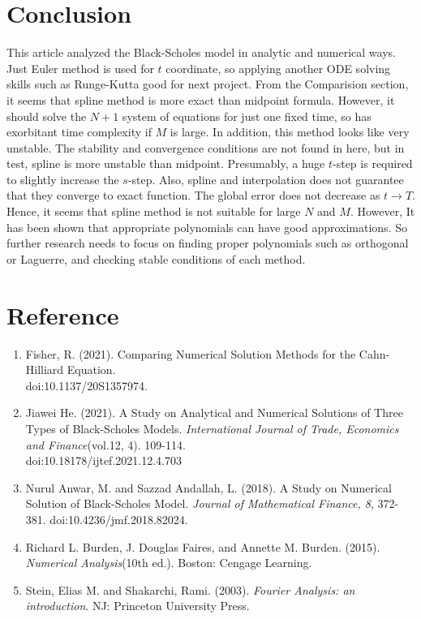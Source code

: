\section{Conclusion}
	This article analyzed the Black-Scholes model in analytic and numerical ways. Just Euler method is used for $t$ coordinate, so applying another ODE solving skills such as Runge-Kutta good for next project. From the Comparision section, it seems that spline method is more exact than midpoint formula. However, it should solve the $N+1$ system of equations for just one fixed time, so has exorbitant time complexity if $M$ is large. In addition, this method looks like very unstable. The stability and convergence conditions are not found in here, but in test, spline is more unstable than midpoint. Presumably, a huge $t$-step is required to slightly increase the $s$-step. Also, spline and interpolation does not guarantee that they converge to exact function. The global error does not decrease as $t\rightarrow T$. Hence, it seems that spline method is not suitable for large $N$ and $M$. However, It has been shown that appropriate polynomials can have good approximations. So further research needs to focus on finding proper polynomials such as orthogonal or Laguerre, and checking
	stable conditions of each method.\\
\section*{Reference}
	\begin{enumerate}
		\item Fisher, R. (2021). Comparing Numerical Solution Methods for the Cahn-Hilliard Equation.\\doi:10.1137/20S1357974.
		\item Jiawei He. (2021). A Study on Analytical and Numerical Solutions of Three
		Types of Black-Scholes Models. \textit{International Journal of Trade, Economics and Finance}(vol.12, 4). 109-114.\\doi:10.18178/ijtef.2021.12.4.703
		\item Nurul Anwar, M. and Sazzad Andallah, L. (2018). A Study on Numerical Solution of Black-Scholes Model. \textit{Journal of Mathematical Finance, 8}, 372-381. doi:10.4236/jmf.2018.82024.
		\item Richard L. Burden, J. Douglas Faires, and Annette M. Burden. (2015). \textit{Numerical Analysis}(10th ed.). Boston: Cengage Learning.
		\item Stein, Elias M. and Shakarchi, Rami. (2003). \textit{Fourier Analysis: an introduction}. NJ: Princeton University Press.
	\end{enumerate}